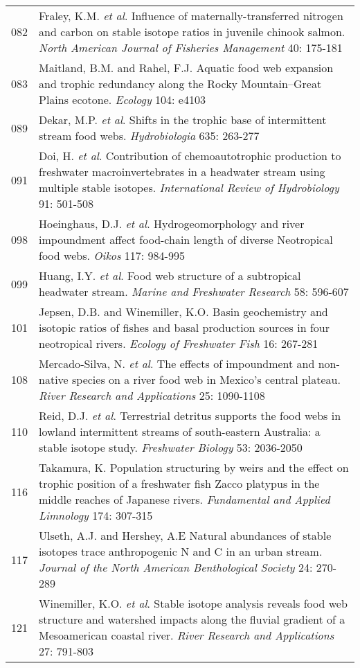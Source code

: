 \begin{longtable}{p{}p{}}
  082 & Fraley, K.M. \textit{et al}. Influence of maternally-transferred nitrogen and carbon on stable isotope ratios in juvenile chinook salmon. \textit{North American Journal of Fisheries Management} 40: 175-181 \\ 
  083 & Maitland, B.M. and Rahel, F.J. Aquatic food web expansion and trophic redundancy along the Rocky Mountain–Great Plains ecotone. \textit{Ecology} 104: e4103 \\ 
  089 & Dekar, M.P. \textit{et al}. Shifts in the trophic base of intermittent stream food webs. \textit{Hydrobiologia} 635: 263-277 \\ 
  091 & Doi, H. \textit{et al}. Contribution of chemoautotrophic production to freshwater macroinvertebrates in a headwater stream using multiple stable isotopes. \textit{International Review of Hydrobiology} 91: 501-508 \\ 
  098 & Hoeinghaus, D.J. \textit{et al}. Hydrogeomorphology and river impoundment affect food-chain length of diverse Neotropical food webs. \textit{Oikos} 117: 984-995 \\ 
  099 & Huang, I.Y. \textit{et al}. Food web structure of a subtropical headwater stream. \textit{Marine and Freshwater Research} 58: 596-607 \\ 
  101 & Jepsen, D.B. and Winemiller, K.O. Basin geochemistry and isotopic ratios of fishes and basal production sources in four neotropical rivers. \textit{Ecology of Freshwater Fish} 16: 267-281 \\ 
  108 & Mercado‐Silva, N. \textit{et al}. The effects of impoundment and non-native species on a river food web in Mexico's central plateau. \textit{River Research and Applications} 25: 1090-1108 \\ 
  110 & Reid, D.J. \textit{et al}. Terrestrial detritus supports the food webs in lowland intermittent streams of south-eastern Australia: a stable isotope study. \textit{Freshwater Biology} 53: 2036-2050 \\ 
  116 & Takamura, K. Population structuring by weirs and the effect on trophic position of a freshwater fish Zacco platypus in the middle reaches of Japanese rivers. \textit{Fundamental and Applied Limnology} 174: 307-315 \\ 
  117 & Ulseth, A.J. and Hershey, A.E Natural abundances of stable isotopes trace anthropogenic N and C in an urban stream. \textit{Journal of the North American Benthological Society} 24: 270-289 \\ 
  121 & Winemiller, K.O. \textit{et al}. Stable isotope analysis reveals food web structure and watershed impacts along the fluvial gradient of a Mesoamerican coastal river. \textit{River Research and Applications} 27: 791-803 \\ 
   \hline
\hline
\end{longtable}
\endgroup
